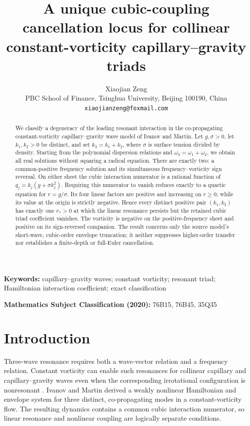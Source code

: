 \documentclass[11pt]{article}
\title{A unique cubic-coupling cancellation locus for collinear\\
constant-vorticity capillary--gravity triads}
\author{Xiaojian Zeng\\
\small PBC School of Finance, Tsinghua University, Beijing 100190, China\\
\small \texttt{xiaojianzeng@foxmail.com}}
\date{}
\theoremstyle{remark}
\begin{document}
\maketitle

\begin{abstract}
We classify a degeneracy of the leading resonant interaction in the
co-propagating constant-vorticity capillary--gravity wave model of Ivanov and
Martin. Let \(g,\sigma>0\), let \(k_1,k_2>0\) be distinct, and set
\(k_3=k_1+k_2\), where \(\sigma\) is surface tension divided by density.
Starting from the polynomial dispersion relations and
\(\omega_3=\omega_1+\omega_2\), we obtain all real solutions without
squaring a radical equation. There are exactly two: a common-positive
frequency solution and its simultaneous frequency--vorticity sign reversal.
On either sheet the cubic interaction numerator is a rational function of
\(q_j=k_j(g+\sigma k_j^2)\). Requiring this numerator to vanish reduces
exactly to a quartic equation for \(r=g/\sigma\). Its four linear factors are
positive and increasing on \(r\geq0\), while its value at the origin is
strictly negative. Hence every distinct positive pair \((k_1,k_2)\) has
exactly one \(r_*>0\) at which the linear resonance persists but the retained
cubic triad coefficient vanishes. The vorticity is negative on the
positive-frequency sheet and positive on its sign-reversed companion. The
result concerns only the source model's short-wave, cubic-order envelope
truncation; it neither suppresses higher-order transfer nor establishes a
finite-depth or full-Euler cancellation.
\end{abstract}

\noindent\textbf{Keywords:} capillary--gravity waves; constant vorticity;
resonant triad; Hamiltonian interaction coefficient; exact classification

\medskip
\noindent\textbf{Mathematics Subject Classification (2020):}
76B15, 76B45, 35Q35

\section{Introduction}

Three-wave resonance requires both a wave-vector relation and a frequency
relation. Constant vorticity can enable such resonances for collinear
capillary and capillary--gravity waves even when the corresponding
irrotational configuration is nonresonant
\cite{ConstantinKartashova2009,Martin2017}. Ivanov and Martin
\cite{IvanovMartin2019} derived a weakly nonlinear Hamiltonian and envelope
system for three distinct, co-propagating modes in a constant-vorticity flow.
The resulting dynamics contains a common cubic interaction numerator, so
linear resonance and nonlinear coupling are logically separate conditions.
\end{document}
